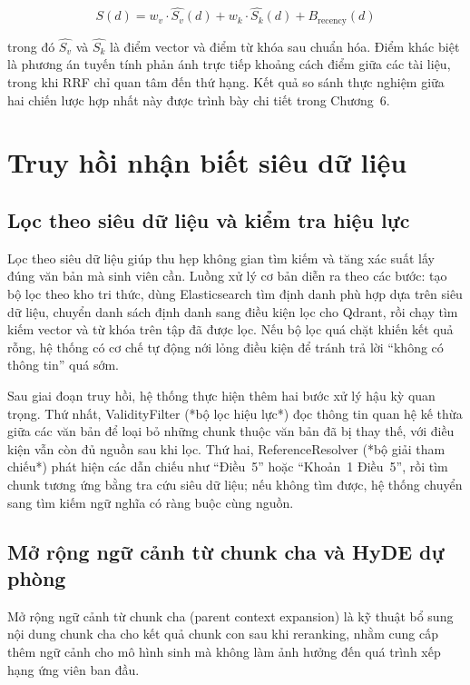 \documentclass[../DoAn.tex]{subfiles}
\begin{document}
\begin{equation}
S(d) =
w_v \cdot \widehat{S_v}(d)
+ w_k \cdot \widehat{S_k}(d)
+ B_{\text{recency}}(d)
\end{equation}

trong đó $\widehat{S_v}$ và $\widehat{S_k}$ là điểm vector và điểm từ khóa sau
chuẩn hóa. Điểm khác biệt là phương án tuyến tính phản ánh trực tiếp khoảng cách
điểm giữa các tài liệu, trong khi RRF chỉ quan tâm đến thứ hạng. Kết quả so sánh
thực nghiệm giữa hai chiến lược hợp nhất này được trình bày chi tiết trong
Chương~6.

\section{Truy hồi nhận biết siêu dữ liệu}

\subsection{Lọc theo siêu dữ liệu và kiểm tra hiệu lực}

Lọc theo siêu dữ liệu giúp thu hẹp không gian tìm kiếm và tăng xác suất lấy
đúng văn bản mà sinh viên cần. Luồng xử lý cơ bản diễn ra theo các bước: tạo
bộ lọc theo kho tri thức, dùng Elasticsearch tìm định danh phù hợp dựa trên
siêu dữ liệu, chuyển danh sách định danh sang điều kiện lọc cho Qdrant, rồi
chạy tìm kiếm vector và từ khóa trên tập đã được lọc. Nếu bộ lọc quá chặt
khiến kết quả rỗng, hệ thống có cơ chế tự động nới lỏng điều kiện để tránh
trả lời ``không có thông tin'' quá sớm.

Sau giai đoạn truy hồi, hệ thống thực hiện thêm hai bước xử lý hậu kỳ quan
trọng. Thứ nhất, ValidityFilter (*bộ lọc hiệu lực*) đọc thông tin quan hệ kế
thừa giữa các văn bản để loại bỏ những chunk thuộc văn bản đã bị thay thế, với
điều kiện vẫn còn đủ nguồn sau khi lọc. Thứ hai, ReferenceResolver (*bộ giải
tham chiếu*) phát hiện các dẫn chiếu như ``Điều~5'' hoặc ``Khoản~1 Điều~5'',
rồi tìm chunk tương ứng bằng tra cứu siêu dữ liệu; nếu không tìm được, hệ
thống chuyển sang tìm kiếm ngữ nghĩa có ràng buộc cùng nguồn.

\subsection{Mở rộng ngữ cảnh từ chunk cha và HyDE dự phòng}

Mở rộng ngữ cảnh từ chunk cha (parent context expansion) là kỹ thuật bổ sung
nội dung chunk cha cho kết quả chunk con sau khi reranking, nhằm cung cấp thêm
ngữ cảnh cho mô hình sinh mà không làm ảnh hưởng đến quá trình xếp hạng ứng
viên ban đầu.
\end{document}
